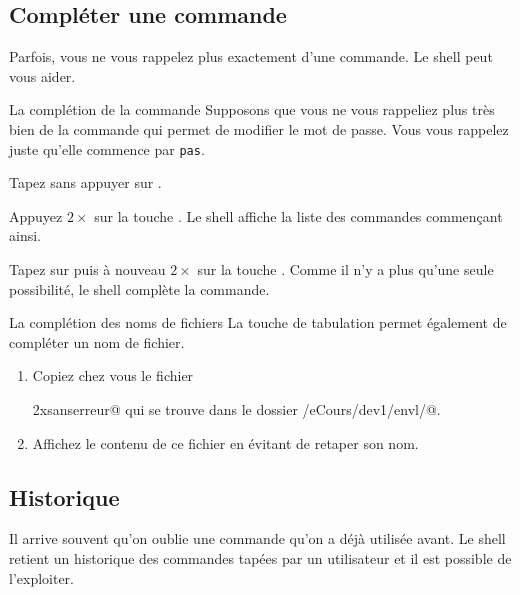 \documentclass[a4paper,11pt]{style-esi/td}
\begin{document}
	\subsection{Compléter une commande}

		Parfois, vous ne vous rappelez plus exactement d'une commande.
		Le shell peut vous aider.  

		\begin{Experience}{La complétion de la commande} 
			Supposons que vous ne vous rappeliez plus très bien 
			de la commande qui permet de modifier le mot de passe.
			Vous vous rappelez juste qu'elle commence par \verb|pas|.
			\begin{steps}
			\item 
				Tapez  sans appuyer sur .
			\item 
				Appuyez $2\times$ sur la touche .
				Le shell affiche la liste des commandes commençant ainsi.
			\item 
				Tapez sur  puis à nouveau $2\times$ sur la touche .
				Comme il n'y a plus qu'une seule possibilité, le shell complète la commande.
			\end{steps}  
		\end{Experience}		

		\begin{Exercice}{La complétion des noms de fichiers} 
			La touche de tabulation permet également de compléter un nom de fichier. 
			\begin{enumerate}
  			\item Copiez chez vous le fichier\par
	  			\verb@monfichieraunomtellementlongquilmeparaitpeuprobabledeletaper2xsanserreur@ 
	  			qui se trouve dans le dossier \verb@/eCours/dev1/envl/@.
			\item Affichez le contenu de ce fichier en évitant de retaper son nom.
			\end{enumerate}
		\end{Exercice}	

	\subsection{Historique}

		Il arrive souvent qu'on oublie une commande qu'on a déjà utilisée avant.
		Le shell retient un historique des commandes tapées par un utilisateur
		et il est possible de l'exploiter.
		
\end{document}
